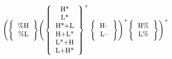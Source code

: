 \begin{math}
\Bigg(
\Bigg\{
  \begin{tabular}{c}
  \%H  \\
  \%L
  \end{tabular}
\Bigg \}
\Bigg(
\left \{
  \begin{tabular}{c}
  H*  \\
  L*  \\
  H*+L  \\
  H+L*  \\
  L*+H  \\
  L+H*  
  \end{tabular}
\right \}^{+}
\Bigg\{
  \begin{tabular}{c}
  H--  \\
  L--
  \end{tabular}
\Bigg \}
\Bigg)^{+}
\Bigg\{
  \begin{tabular}{c}
  H\%  \\
  L\%
  \end{tabular}
\Bigg \}
\Bigg)^{+}
\end{math}